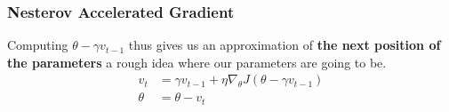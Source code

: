 \documentclass{beamer}
\begin{document}
\begin{frame}
    \frametitle{Nesterov Accelerated Gradient}
    

    
    Computing $\theta-\gamma v_{t-1}$ thus gives us an approximation of \textbf{the next position of the parameters} a rough idea where our parameters are going to be. 
    \begin{equation}
         \begin{aligned} v_{t} &=\gamma v_{t-1}+\eta \nabla_{\theta} J\left(\theta-\gamma v_{t-1}\right) \\ \theta &=\theta-v_{t} \end{aligned}
    \end{equation}
\end{frame}
\end{document}
